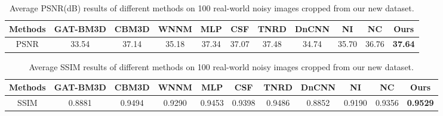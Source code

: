 \begin{table}[t!]
\begin{adjustwidth}{-.2cm}{}
\scriptsize
\caption{Average PSNR(dB) results of different methods on 100 real-world noisy images cropped from our new dataset.}

\label{tab3-6}
\begin{center}
\renewcommand\arraystretch{1}
\begin{tabular}{|c||c|c|c|c|c|c|c|c|c|c|}
\hline
Methods
&\textbf{GAT-BM3D}
&\textbf{CBM3D}
&\textbf{WNNM}
&\textbf{MLP}
&\textbf{CSF} 
&\textbf{TNRD} 
&\textbf{DnCNN}
&\textbf{NI} 
&\textbf{NC} 
&\textbf{Ours} 
\\
\hline
PSNR  
& 33.54 & 37.14 & 35.18 & 37.34 & 37.07 & 37.48 & 34.74 & 35.70 & 36.76 & \textbf{37.64}
\\
\hline
\end{tabular}
\end{center}
\end{adjustwidth}\vspace{-4mm}
\end{table}



\begin{table}[t!]
\begin{adjustwidth}{-.2cm}{}
\scriptsize
\caption{Average SSIM \cite{ssim} results of different methods on 100 real-world noisy images cropped from our new dataset.}
\label{tab3-7}
\begin{center}
\renewcommand\arraystretch{1}
\begin{tabular}{|c||c|c|c|c|c|c|c|c|c|c|}
\hline
Methods
&\textbf{GAT-BM3D}
&\textbf{CBM3D}
&\textbf{WNNM}
&\textbf{MLP}
&\textbf{CSF} 
&\textbf{TNRD} 
&\textbf{DnCNN}
&\textbf{NI} 
&\textbf{NC} 
&\textbf{Ours} 
\\
\hline
SSIM  
& 0.8881 & 0.9494 & 0.9290 & 0.9453 & 0.9398 & 0.9486 & 0.8852 & 0.9190 & 0.9356 & \textbf{0.9529}
\\
\hline
\end{tabular}
\end{center}
\end{adjustwidth}\vspace{-4mm}
\end{table}



